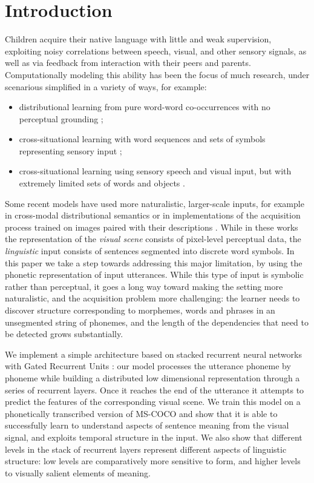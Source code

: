 \section{Introduction}
\label{sec:intro}

Children acquire their native language with little and weak
supervision, exploiting noisy correlations between speech, visual, and
other sensory signals, as well as via feedback from interaction with
their peers and parents. Computationally modeling this ability has
been the focus of much research, under scenarious simplified
in a variety of ways, for example:

\begin{itemize}
\item distributional learning from pure word-word co-occurrences with
  no perceptual grounding \cite{landauer1998introduction,kiros2015skip};
\item cross-situational learning with word sequences and sets of
  symbols representing sensory input
  \cite{siskind.96,fazly.etal.10csj};
\item cross-situational learning using sensory speech and visual
  input, but with extremely limited sets of words and objects
  \cite{Roy2002113,iwahashi2003language}.
\end{itemize}

Some recent models have used more naturalistic, larger-scale inputs,
for example in cross-modal distributional semantics
\cite{lazaridou2015combining} or in implementations of the acquisition
process trained on images paired with their descriptions
\cite{chrupala2015learning}. While in these works the representation
of the {\it visual scene} consists of pixel-level perceptual data, the
{\it linguistic} input consists of sentences segmented into discrete
word symbols. In this paper we take a step towards addressing this
major limitation, by using the phonetic representation of input
utterances. While this type of input is symbolic rather than
perceptual, it goes a long way toward making the setting more
naturalistic, and the acquisition problem more challenging: the
learner needs to discover structure corresponding to morphemes, words
and phrases in an unsegmented string of phonemes, and the length of
the dependencies that need to be detected grows substantially.

We implement a simple architecture based on stacked recurrent neural
networks with Gated Recurrent Units \cite{chung2014empirical}: our
model processes the utterance phoneme by phoneme while building a
distributed low dimensional representation through a series of
recurrent layers. Once it reaches the end of the utterance it attempts
to predict the features of the corresponding visual scene. We train
this model on a phonetically transcribed version of MS-COCO
\cite{lin2014microsoft} and show that it is able to successfully learn
to understand aspects of sentence meaning from the visual signal, and 
exploits temporal structure in the input. We also show that different
levels in the stack of recurrent layers represent different aspects of
linguistic structure: low levels are comparatively more sensitive to
form, and higher levels to visually salient elements of meaning.
